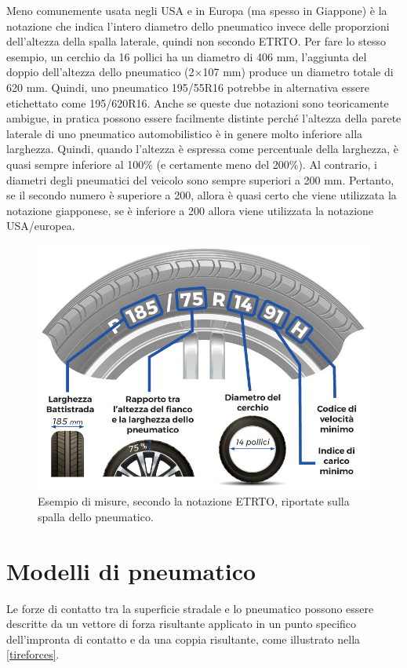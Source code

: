 Meno comunemente usata negli USA e in Europa (ma spesso in Giappone) è la notazione che indica l'intero diametro dello pneumatico invece delle proporzioni dell'altezza della spalla laterale, quindi non secondo \ac{ETRTO}. Per fare lo stesso esempio, un cerchio da 16 pollici ha un diametro di 406 mm, l'aggiunta del doppio dell'altezza dello pneumatico (2$\times$107 mm) produce un diametro totale di 620 mm. Quindi, uno pneumatico 195/55R16 potrebbe in alternativa essere etichettato come 195/620R16. Anche se queste due notazioni sono teoricamente ambigue, in pratica possono essere facilmente distinte perché l'altezza della parete laterale di uno pneumatico automobilistico è in genere molto inferiore alla larghezza. Quindi, quando l'altezza è espressa come percentuale della larghezza, è quasi sempre inferiore al 100\% (e certamente meno del 200\%). Al contrario, i diametri degli pneumatici del veicolo sono sempre superiori a 200 mm. Pertanto, se il secondo numero è superiore a 200, allora è quasi certo che viene utilizzata la notazione giapponese, se è inferiore a 200 allora viene utilizzata la notazione USA/europea.

\begin{figure}[h]
	\centering
	\includegraphics[width=0.7\linewidth]{Figures/tire_measures}
	\caption{Esempio di misure, secondo la notazione ETRTO, riportate sulla spalla dello pneumatico.}
	\label{tiremeasures}
\end{figure}
%
\section{Modelli di pneumatico}
Le forze di contatto tra la superficie stradale e lo pneumatico possono essere descritte da un vettore di forza risultante applicato in un punto specifico dell'impronta di contatto e da una coppia risultante, come illustrato nella \figurename{  \ref{tireforces}}.

